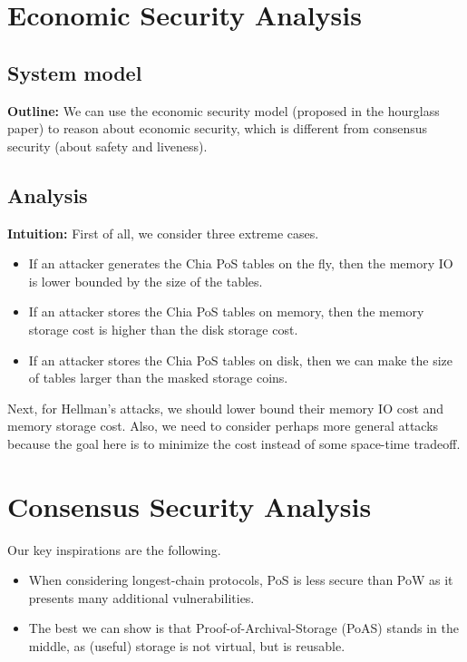 \documentclass[12pt,draftcls,onecolumn]{IEEEtran}
\begin{document}


\section{Economic Security Analysis}

\subsection{System model}

{\bf Outline:} We can use the economic security model (proposed in the hourglass paper) to reason about economic security, which is different from consensus security (about safety and liveness).

\subsection{Analysis}

{\bf Intuition:} First of all, we consider three extreme cases.
\begin{itemize}
    \item If an attacker generates the Chia PoS tables on the fly, then the memory IO is lower bounded by the size of the tables.
    \item If an attacker stores the Chia PoS tables on memory, then the memory storage cost is higher than the disk storage cost.
    \item If an attacker stores the Chia PoS tables on disk, then we can make the size of tables larger than the masked storage coins.
\end{itemize}

Next, for Hellman's attacks, we should lower bound their memory IO cost and memory storage cost.
Also, we need to consider perhaps more general attacks because the goal here is to minimize the cost instead of some space-time tradeoff.

\section{Consensus Security Analysis}

Our key inspirations are the following.

\begin{itemize}
    \item When considering longest-chain protocols, PoS is less secure than PoW as it presents many additional vulnerabilities. 
    \item The best we can show is that Proof-of-Archival-Storage (PoAS) stands in the middle, as (useful) storage is not virtual, but is reusable.
\end{itemize}
\end{document}
